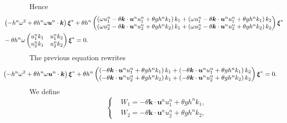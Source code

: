 \documentclass[a4paper, 11pt]{article}
\begin{document}
Hence
\begin{equation*}
\begin{split}
&\hspace*{-1.5cm}\left(-h^n\omega^2+\theta h^n\omega \boldsymbol{u}^n\cdot \boldsymbol{k}\right)\boldsymbol{\xi}^*+\theta h^n \begin{pmatrix}\left(\omega u_1^n-\theta\boldsymbol{k}\cdot \boldsymbol{u}^n u_1^n+\theta g h^nk_1\right)k_1+\left(\omega u_1^n-\theta\boldsymbol{k}\cdot \boldsymbol{u}^n u_1^n+\theta g h^nk_1\right)k_2 \\
\left(\omega u_2^n-\theta\boldsymbol{k}\cdot \boldsymbol{u}^n u_2^n+\theta g h^nk_2\right)k_1+\left(\omega u_2^n-\theta\boldsymbol{k}\cdot \boldsymbol{u}^n u_2^n+\theta g h^nk_2\right)k_2\end{pmatrix}\boldsymbol{\xi}^*\\
&\hspace*{-1.5cm}-\theta h^n \omega \begin{pmatrix}u_1^nk_1&u_1^nk_2\\u_2^nk_1 &u_2^nk_2\end{pmatrix}\boldsymbol{\xi}^*=0.
\end{split}
\end{equation*}
The previous equation rewrites
\begin{equation*}
\begin{split}
&\hspace*{-1.5cm}\left(-h^n\omega^2+\theta h^n\omega \boldsymbol{u}^n\cdot \boldsymbol{k}\right)\boldsymbol{\xi}^*+\theta h^n \begin{pmatrix}\left(-\theta\boldsymbol{k}\cdot \boldsymbol{u}^n u_1^n+\theta g h^nk_1\right)k_1+\left(-\theta\boldsymbol{k}\cdot \boldsymbol{u}^n u_1^n+\theta g h^nk_1\right)k_2 \\
\left(-\theta\boldsymbol{k}\cdot \boldsymbol{u}^n u_2^n+\theta g h^nk_2\right)k_1+\left(-\theta\boldsymbol{k}\cdot \boldsymbol{u}^n u_2^n+\theta g h^nk_2\right)k_2\end{pmatrix}\boldsymbol{\xi}^*=0.
\end{split}
\end{equation*}
We define 
\begin{equation*}
\left\{
\begin{split}
&W_1=-\theta\boldsymbol{k}\cdot \boldsymbol{u}^n u_1^n+\theta g h^nk_1,\\
&W_2=-\theta\boldsymbol{k}\cdot \boldsymbol{u}^n u_2^n+\theta g h^nk_2,
\end{split}
\right.
\end{equation*}
\end{document}
